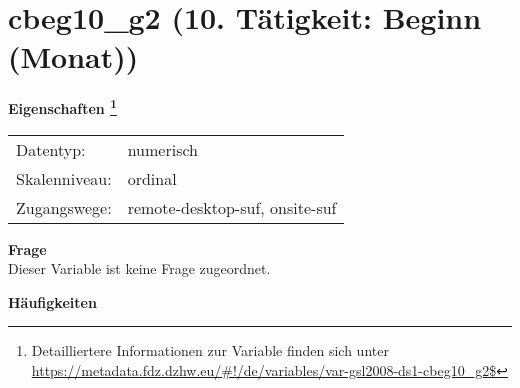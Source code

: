 
    \setcounter{footnote}{0}

    \vspace*{-1.8cm}
	\section{cbeg10\_g2 (10. Tätigkeit: Beginn (Monat))}
	\label{section:cbeg10_g2}



    \vspace*{0.5cm}
    \noindent\textbf{Eigenschaften
	\footnote{Detailliertere Informationen zur Variable finden sich unter
		\url{https://metadata.fdz.dzhw.eu/\#!/de/variables/var-gsl2008-ds1-cbeg10_g2$}}}\\
	\begin{tabularx}{\hsize}{@{}lX}
	Datentyp: & numerisch \\
	Skalenniveau: & ordinal \\
	Zugangswege: &
	  remote-desktop-suf, 
	  onsite-suf
 \\
    \end{tabularx}



		\vspace*{0.5cm}
		\noindent\textbf{Frage}\\
		Dieser Variable ist keine Frage zugeordnet.





        		\vspace*{0.5cm}
                \noindent\textbf{Häufigkeiten}

